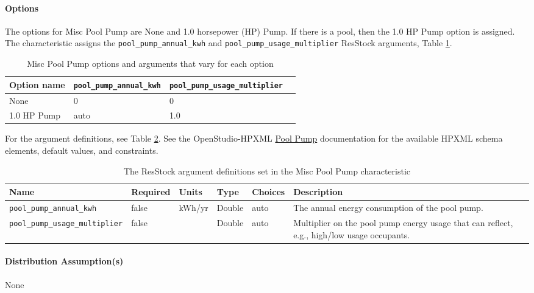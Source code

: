 \paragraph{Options}
The options for Misc Pool Pump are None and 1.0 horsepower (HP) Pump. If there is a pool, then the 1.0 HP Pump option is assigned. The characteristic assigns the \texttt{pool\_pump\_annual\_kwh} and \texttt{pool\_pump\_usage\_multiplier} ResStock arguments, Table \ref{table:opt_def_pool_pump}. 

\begin{longtable}[]{ |p{2.5cm}|p{4cm}|p{4cm}|p{4cm}| }
\caption{Misc Pool Pump options and arguments that vary for each option} \label{table:opt_def_pool_pump} \\
\toprule\noalign{}
Option name & \texttt{pool\_pump\_annual\_kwh} &
\texttt{pool\_pump\_usage\_multiplier} \\
\midrule\noalign{}
\endhead
\bottomrule\noalign{}
\endlastfoot
None & 0 & 0 \\
1.0 HP Pump & auto & 1.0 \\
\end{longtable}

For the argument definitions, see Table \ref{table:hc_arg_def_pool_pump}. See the OpenStudio-HPXML \href{https://openstudio-hpxml.readthedocs.io/en/v1.8.1/workflow_inputs.html#pool-pump}{ Pool Pump} documentation for the available HPXML schema elements, default values, and constraints.

\begin{longtable}[]{|p{}|p{1.5cm}|p{1.5cm}|p{1.1cm}|p{2.4cm}|p{4.5cm}|}
\caption{The ResStock argument definitions set in the Misc Pool Pump characteristic} \label{table:hc_arg_def_pool_pump} \\
\toprule\noalign{}
Name & Required & Units & Type & Choices & Description \\
\midrule\noalign{}
\endhead
\bottomrule\noalign{}
\endlastfoot
\texttt{pool\_pump\_annual\_kwh} & false & kWh/yr & Double & auto & The
annual energy consumption of the pool pump. \\
\hline
\texttt{pool\_pump\_usage\_multiplier} & false & & Double & auto &
Multiplier on the pool pump energy usage that can reflect, e.g.,
high/low usage occupants.  \\
\end{longtable}

\paragraph{Distribution Assumption(s)}
None

